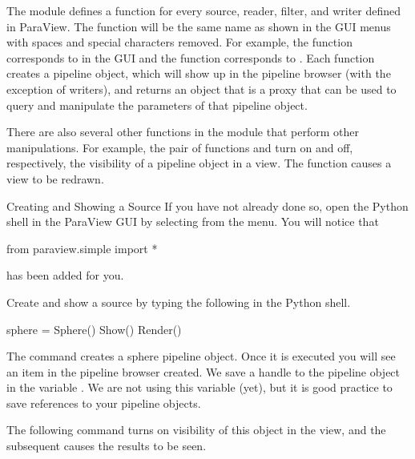 The  module defines a function for every source,
reader, filter, and writer defined in ParaView.  The function will be the
same name as shown in the GUI menus with spaces and special characters
removed.  For example, the  function corresponds to
 \ra {} in the GUI and the 
function corresponds to  \ra {} \ra {}.  Each function creates a pipeline object, which will show up
in the pipeline browser (with the exception of writers), and returns an
object that is a proxy that can be used to query and manipulate the
parameters of that pipeline object.

There are also several other functions in the 
module that perform other manipulations.  For example, the pair of
functions  and  turn on and off, respectively,
the visibility of a pipeline object in a view.  The 
function causes a view to be redrawn.

\begin{exercise}{Creating and Showing a Source}
  \label{ex:CreatingAndShowingASource}%
  If you have not already done so, open the Python shell in the ParaView
  GUI by selecting  \ra {} from the menu.  You
  will notice that
  \begin{python}
from paraview.simple import *
  \end{python}
  has been added for you.

  Create and show a  source by typing the following in the
  Python shell.
  \begin{python}
sphere = Sphere()
Show()
Render()
  \end{python}

  The  command creates a sphere pipeline object.  Once it is
  executed you will see an item in the pipeline browser created.  We save a
  handle to the pipeline object in the variable .  We are
  not using this variable (yet), but it is good practice to save references
  to your pipeline objects.

  The following  command turns on visibility of this object in
  the view, and the subsequent  causes the results to be seen.
\end{exercise}


